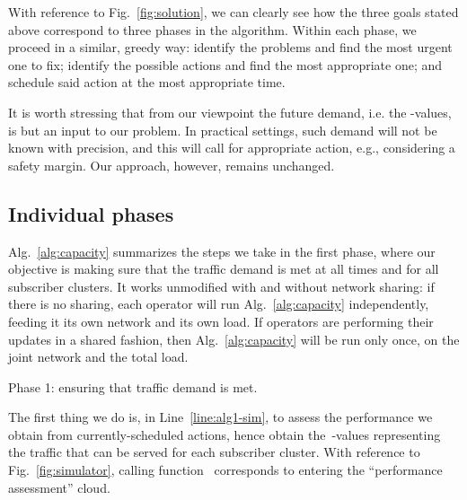 \documentclass[10pt,journal,cspaper,compsoc]{IEEEtran}
\newcommand{\Fig}[1]{Fig.~\ref{fig:#1}}
\newcommand{\Alg}[1]{Alg.~\ref{alg:#1}}
\newcommand{\Line}[1]{Line~\ref{line:#1}}
\begin{document}
With reference to \Fig{solution}, we can clearly see how the three goals stated above correspond to three
phases in the algorithm. Within each phase, we proceed in a similar, greedy way: identify the problems and find the most
urgent one to fix; identify the possible actions and find the most appropriate one; and schedule said action at the
most appropriate time.

It is worth stressing that from our viewpoint the future demand, i.e. the -values, is but an input to
our problem. In practical settings, such demand will not be known with precision, and this will call for 
appropriate action, e.g., considering a safety margin. Our approach, however, remains unchanged.

\subsection{Individual phases}

\Alg{capacity} summarizes the steps we take in the first phase, where our objective is making sure that
the traffic demand is met at all times and for all subscriber clusters.
It works unmodified with and without network sharing: if there is no sharing, each
operator will run \Alg{capacity} independently, feeding it its own network and its own
load. If operators are performing their updates in a shared fashion,
then \Alg{capacity} will be run only once, on the joint network and the total load.

\begin{algorithm}[t]
\begin{algorithmic}[1]
\Require 
{}
	\State  \label{line:alg1-sim}
	\State  \label{line:alg1-findproblem}
	\If{} \label{line:alg1-checkempty}
	\EndIf
	\State  \label{line:alg1-mosturgent}
	\State  \label{line:alg1-findbss}
	\State  \label{line:alg1-bestbs}
	\State  \label{line:alg1-besttype}
	\State  \label{line:alg1-besttime}
	\State  \label{line:alg1-schedule}
\EndWhile
\Return 
\end{algorithmic}
\caption{Phase 1: ensuring that traffic demand is met.
  \label{alg:capacity}}
\end{algorithm}

The first thing we do is, in \Line{alg1-sim}, to assess the performance we obtain from
currently-scheduled actions, hence obtain the~-values
representing the traffic that can be served for each subscriber cluster.
With reference to \Fig{simulator}, calling function~
corresponds to entering the ``performance assessment'' cloud.
\end{document}
